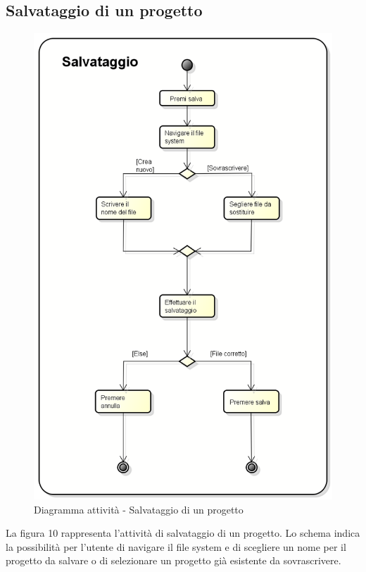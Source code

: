 \subsection{Salvataggio di un progetto}
\begin{figure}[h] 
	\centering 
	\includegraphics[scale=0.3] {img/Activity_salvataggio.png} 
	\caption{Diagramma attività - Salvataggio di un progetto} 
\end{figure}
La figura 10 rappresenta l'attività di salvataggio di un progetto. Lo schema indica la possibilità per l'utente di navigare il file system e di scegliere un nome per il progetto da salvare o di selezionare un progetto già esistente da sovrascrivere.
\newpage